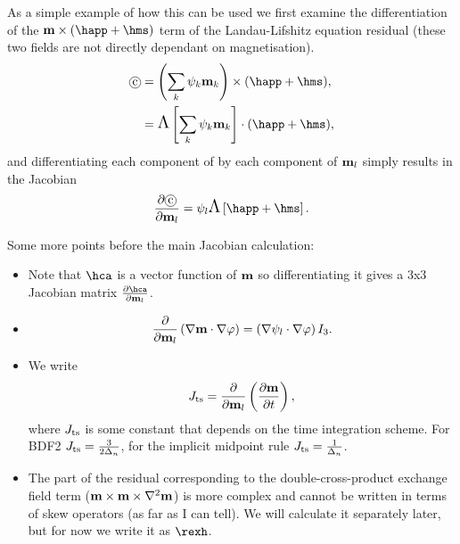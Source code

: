As a simple example of how this can be used we first examine the differentiation of the $\mv \times (\happ + \hms)$ term of the Landau-Lifshitz equation residual (these two fields are not directly dependant on magnetisation).
\begin{align}
  \circled{c} &= \intpb{\mv} \times (\happ + \hms), \notag\\
  &= \skewm{\intp{\mv}} \cdot (\happ + \hms),
\end{align}
and differentiating each component of  by each component of $\mathbf{m}_l$ simply results in the Jacobian
\begin{align}
  \pd{\circled{c}}{\mv_l} = \sbf_l \skewm{\happ + \hms}.
\end{align}

Some more points before the main Jacobian calculation:

\begin{itemize}
\item Note that $\hca$ is a vector function of $\mathbf{m}$ so differentiating it gives a 3x3 Jacobian matrix  $\pd{\hca}{\mv_l}$.

\item  \begin{equation}
    \frac{\partial }{\partial \mathbf{m}_l} \left(\nabla \mathbf{m} \cdot \nabla \varphi\right) =
    \left(\nabla \psi_l \cdot \nabla \varphi \right) I_3.
  \end{equation}

\item We write
  \begin{equation}
    J_\text{ts} = \frac{\partial }{\partial \mathbf{m}_l} \left(\frac{\partial \mathbf{m}}{\partial t} \right),
  \end{equation}
  where $J_\text{ts}$ is some constant that depends on the time integration scheme.
  For BDF2 $J_\text{ts} = \frac{3}{2\Delta_{n}}$, for the implicit midpoint rule $J_\text{ts} = \frac{1}{\Delta_{n}}$.
\item The part of the residual corresponding to the double-cross-product exchange field term ($\mathbf{m} \times \mathbf{m} \times \nabla^2 \mathbf{m}$) is more complex and cannot be written in terms of skew operators (as far as I can tell).
  We will calculate it separately later, but for now we write it as $\rexh$.
\end{itemize}


